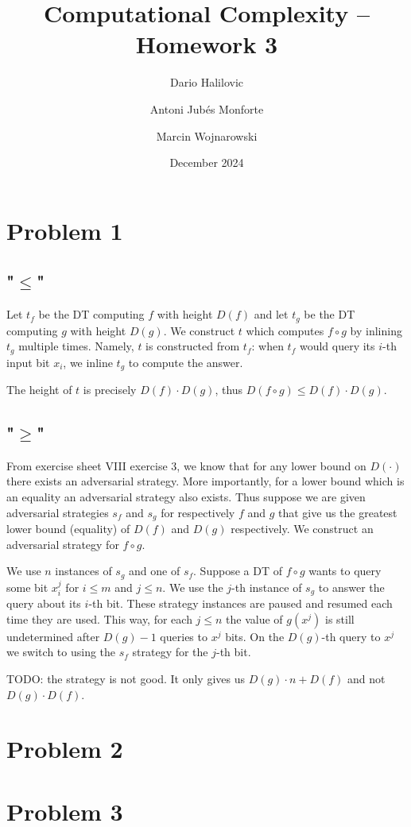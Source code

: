 \documentclass{article}
\title{Computational Complexity -- Homework 3}
\author{Dario Halilovic\and
Antoni Jubés Monforte\and
Marcin Wojnarowski}
\date{December 2024}
\begin{document}
\maketitle

\section*{Problem 1}

\subsection*{"$\le$"}

Let $t_f$ be the DT computing $f$ with height $D(f)$ and let $t_g$ be the DT computing $g$ with height $D(g)$. We construct $t$ which computes $f \circ g$ by inlining $t_g$ multiple times. Namely, $t$ is constructed from $t_f$: when $t_f$ would query its $i$-th input bit $x_i$, we inline $t_g$ to compute the answer.

The height of $t$ is precisely $D(f) \cdot D(g)$, thus $D(f \circ g) \le D(f) \cdot D(g)$.

\subsection*{"$\ge$"}

From exercise sheet VIII exercise 3, we know that for any lower bound on $D(\cdot)$ there exists an adversarial strategy. More importantly, for a lower bound which is an equality an adversarial strategy also exists. Thus suppose we are given adversarial strategies $s_f$ and $s_g$ for respectively $f$ and $g$ that give us the greatest lower bound (equality) of $D(f)$ and $D(g)$ respectively. We construct an adversarial strategy for $f \circ g$.

We use $n$ instances of $s_g$ and one of $s_f$. Suppose a DT of $f \circ g$ wants to query some bit $x_i^j$ for $i \le m$ and $j \le n$. We use the $j$-th instance of $s_g$ to answer the query about its $i$-th bit. These strategy instances are paused and resumed each time they are used. This way, for each $j \le n$ the value of $g(x^j)$ is still undetermined after $D(g)-1$ queries to $x^j$ bits. On the $D(g)$-th query to $x^j$ we switch to using the $s_f$ strategy for the $j$-th bit.

TODO: the strategy is not good. It only gives us $D(g)\cdot n + D(f)$ and not $D(g) \cdot D(f)$.

\section*{Problem 2}

\section*{Problem 3}
\end{document}
